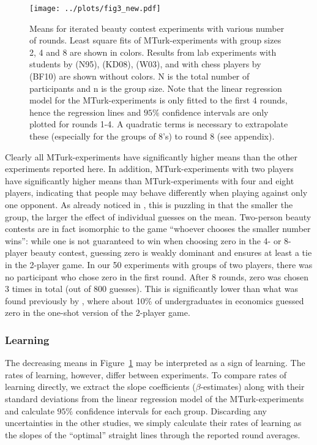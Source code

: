 \documentclass[12pt,review]{elsarticle}
\begin{document}
\begin{figure}
\texttt{[image: ../plots/fig3\_new.pdf]}
\caption{Means for iterated beauty contest experiments with various number of rounds. Least square fits of MTurk-experiments with group sizes 2, 4 and 8 are shown in colors. Results from lab experiments with students by \citet{Nagel95} (N95), \citet{Kamm2008unter} (KD08), \citet{weber2003learning} (W03), and with chess players by \citet{buhren2010chess} (BF10) are shown without colors. N is the total number of participants and n is the group size. Note that the linear regression model for the MTurk-experiments is only fitted to the first 4 rounds, hence the regression lines and $95\%$ confidence intervals are only plotted for rounds 1-4. A quadratic terms is necessary to extrapolate these (especially for the groups of 8's) to round 8 (see appendix).}
\label{fig:means}
\end{figure}

Clearly all MTurk-experiments have significantly higher means than the other experiments reported here. In addition, MTurk-experiments with two players have significantly higher means than MTurk-experiments with four and eight players, indicating that people may behave differently when playing against only one opponent. As already noticed in \citet{HoCamererWeigelt98}, this is puzzling in that the smaller the group, the larger the effect of individual guesses on the mean. Two-person beauty contests are in fact isomorphic to the game \textquotedblleft whoever chooses the smaller number wins\textquotedblright : while one is not guaranteed to win when choosing zero in the 4- or 8-player beauty contest, guessing zero is weakly dominant and ensures at least a tie in the 2-player game. In our 50 experiments with groups of two players, there was no participant who chose zero in the first round. After 8 rounds, zero was chosen 3 times in total (out of 800 guesses). This is significantly lower than what was found previously by \citet{NagelGrosskopf2008}, where about 10\% of undergraduates in economics guessed zero in the one-shot version of the 2-player game.

\subsubsection{Learning}
\noindent
The decreasing means in Figure~\ref{fig:means} may be interpreted as a sign of learning. The rates of learning, however, differ between experiments. To compare rates of learning directly, we extract the slope coefficients ($\beta$-estimates) along with their standard deviations from the linear regression model of the MTurk-experiments and calculate $95\%$ confidence intervals for each group. Discarding any uncertainties in the other studies, we simply calculate their rates of learning as the slopes of the ``optimal'' straight lines through the reported round averages. 
\end{document}
